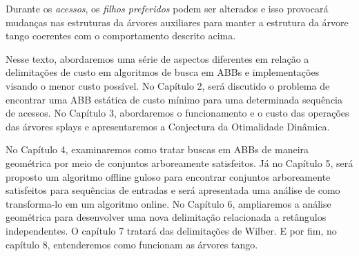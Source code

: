 Durante os \textit{acessos}, os \textit{filhos preferidos} podem ser alterados e isso provocará mudanças nas estruturas da árvores auxiliares para manter a estrutura da árvore tango coerentes com o comportamento descrito acima.

Nesse texto, abordaremos uma série de aspectos diferentes em relação a delimitações de custo em algoritmos de busca em ABBs e implementações visando o menor custo possível. No Capítulo 2, será discutido o problema de encontrar uma ABB estática de custo mínimo para uma determinada sequência de acessos. No Capítulo 3, abordaremos o funcionamento e o custo das operações das árvores splays e apresentaremos a Conjectura da Otimalidade Dinâmica. 

No Capítulo 4, examinaremos como tratar buscas em ABBs de maneira geométrica por meio de conjuntos arboreamente satisfeitos. Já no Capítulo 5, será proposto um algoritmo offline guloso para encontrar conjuntos arboreamente satisfeitos para sequências de entradas e será apresentada uma análise de como transforma-lo em um algoritmo online. No Capítulo 6, ampliaremos a análise geométrica para desenvolver uma nova delimitação relacionada a retângulos independentes. O capítulo 7 tratará das delimitações de Wilber. E por fim, no capítulo 8, entenderemos como funcionam as árvores tango.